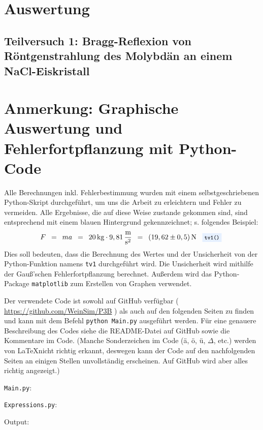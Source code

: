 \documentclass{article}
\newcommand{\widespace}{\enspace}
\newcommand{\wideeq}{\widespace = \widespace}
\newcommand{\result}[2]{
    #1 \, \text{#2}
}
\newcommand{\coderef}[1]{
    \text{
        \enspace
        \footnotesize
        \colorbox{codebg}{\texttt{#1()}}
    }
}
\newcommand{\githuburl}{
    \url{https://github.com/WeinSim/P3B}
}
\begin{document}
\newpage

\section{Auswertung}

    \subsection{Teilversuch 1: Bragg-Reflexion von Röntgenstrahlung des Molybdän an einem NaCl-Eiskristall}

    \newpage

\section{Anmerkung: Graphische Auswertung und Fehlerfortpflanzung mit Python-Code}

Alle Berechnungen inkl. Fehlerbestimmung wurden mit einem selbstgeschriebenen
Python-Skript durchgeführt, um uns die Arbeit zu erleichtern und Fehler zu
vermeiden. Alle Ergebnisse, die auf diese Weise zustande gekommen sind,
sind entsprechend mit einem \colorbox{codebg}{blauen Hintergrund} gekennzeichnet;
s. folgendes Beispiel:
\[
    F \wideeq ma \wideeq \result{20}{kg} \cdot 9,81 \, \frac{\text m}{\text s^2}
    \wideeq \result{(19,62 \pm 0,5)}{N} \coderef{tv1}
\]
Dies soll bedeuten, dass die Berechnung des Wertes und der Unsicherheit von der
Python-Funktion namens \verb|tv1| durchgeführt wird.
Die Unsicherheit wird mithilfe der Gauß'schen Fehlerfortpflanzung berechnet.
Außerdem wird das Python-Package \texttt{matplotlib} zum Erstellen
von Graphen verwendet.

Der verwendete Code ist sowohl auf GitHub verfügbar (\githuburl) als auch auf den
folgenden Seiten zu finden und kann mit dem Befehl \texttt{python Main.py}
ausgeführt werden. Für eine genauere Beschreibung des Codes siehe die README-Datei
auf GitHub sowie die Kommentare im Code.
(Manche Sonderzeichen im Code (ä, ö, ü, $\Delta$, etc.) werden von \LaTeX nicht
richtig erkannt, deswegen kann der Code auf den nachfolgenden Seiten an einigen
Stellen unvollständig erscheinen. Auf GitHub wird aber alles richtig angezeigt.)

\newpage


\verb|Main.py|:

\newpage

\verb|Expressions.py|:

\newpage

Output:

\end{document}
